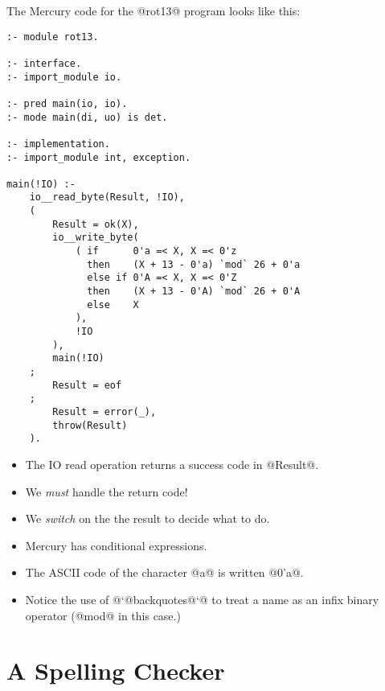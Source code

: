 The Mercury code for the @rot13@ program looks like this:
\begin{verbatim}
:- module rot13.

:- interface.
:- import_module io.

:- pred main(io, io).
:- mode main(di, uo) is det.

:- implementation.
:- import_module int, exception.

main(!IO) :-
    io__read_byte(Result, !IO),
    (
        Result = ok(X),
        io__write_byte(
            ( if      0'a =< X, X =< 0'z
              then    (X + 13 - 0'a) `mod` 26 + 0'a
              else if 0'A =< X, X =< 0'Z
              then    (X + 13 - 0'A) `mod` 26 + 0'A
              else    X
            ),
            !IO
        ),
        main(!IO)
    ;
        Result = eof
    ;
        Result = error(_),
        throw(Result)
    ).
\end{verbatim}
\begin{itemize}
\item The IO read operation returns a success code in @Result@.
\item We \emph{must} handle the return code!
\item We \emph{switch} on the the result to decide what to do.
\item Mercury has conditional expressions.
\item The ASCII code of the character @a@ is written @0'a@.
\item Notice the use of @`@backquotes@`@ to treat a name as an infix
binary operator (@mod@ in this case.)
\end{itemize}



\section{A Spelling Checker}

